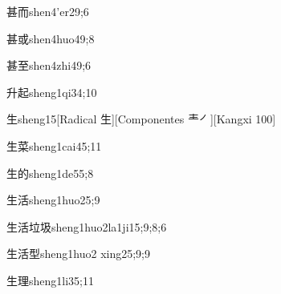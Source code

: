 \begin{verbete}{甚而}{shen4'er2}{9;6}
\end{verbete}

\begin{verbete}{甚或}{shen4huo4}{9;8}
\end{verbete}

\begin{verbete}{甚至}{shen4zhi4}{9;6}
\end{verbete}

\begin{verbete}{升起}{sheng1qi3}{4;10}
\end{verbete}

\begin{verbete}{生}{sheng1}{5}[Radical 生][Componentes 龶㇒][Kangxi 100]
\end{verbete}

\begin{verbete}{生菜}{sheng1cai4}{5;11}
\end{verbete}

\begin{verbete}{生的}{sheng1de5}{5;8}
\end{verbete}

\begin{verbete}{生活}{sheng1huo2}{5;9}
\end{verbete}

\begin{verbete}{生活垃圾}{sheng1huo2la1ji1}{5;9;8;6}
\end{verbete}

\begin{verbete}{生活型}{sheng1huo2 xing2}{5;9;9}
\end{verbete}

\begin{verbete}{生理}{sheng1li3}{5;11}
\end{verbete}

